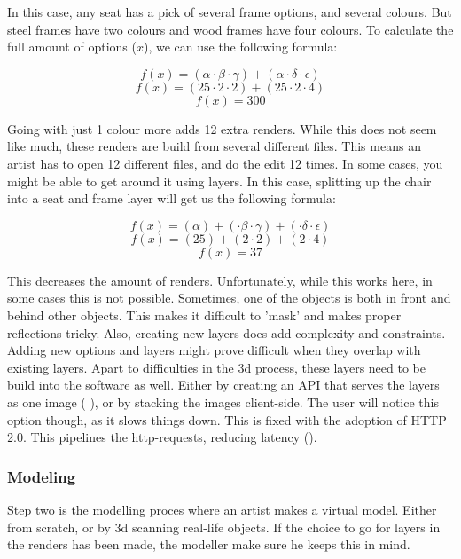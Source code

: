 In this case, any seat has a pick of several frame options, and several colours. But steel frames have two colours and wood frames have four colours. To calculate the full amount of options ($x$), we can use the following formula:
 
\[ f(x) = (\alpha \cdot \beta \cdot \gamma) + (\alpha \cdot \delta \cdot \epsilon)\]
\[ f(x) = (25 \cdot 2 \cdot 2) + (25 \cdot 2 \cdot 4)\]
\[ f(x) = 300\]

Going with just 1 colour more adds 12 extra renders. While this does not seem like much, these renders are build from several different files. This means an artist has to open 12 different files, and do the edit 12 times.
In some cases, you might be able to get around it using layers. In this case, splitting up the chair into a seat and frame layer will get us the following formula:

\[ f(x) = (\alpha) + (\cdot \beta \cdot \gamma) + (\cdot \delta \cdot \epsilon)\]
\[ f(x) = (25) + (2 \cdot 2) + (2 \cdot 4)\]
\[ f(x) = 37\]

This decreases the amount of renders. Unfortunately, while this works here, in some cases this is not possible. Sometimes, one of the objects is both in front and behind other objects. This makes it difficult to 'mask' and makes proper reflections tricky. Also, creating new layers does add complexity and constraints. Adding new options and layers might prove difficult when they overlap with existing layers.
\newline
Apart to difficulties in the 3d process, these layers need to be build into the software as well. Either by creating an API that serves the layers as one image (\cite{bugaboo} ), or by stacking the images client-side. The user will notice this option though, as it slows things down. This is fixed with the adoption of HTTP 2.0. This pipelines the http-requests, reducing latency (\cite{latency}).

\subsubsection{Modeling}
Step two is the modelling proces where an artist makes a virtual model. Either from scratch, or by 3d scanning real-life objects. If the choice to go for layers in the renders has been made, the modeller make sure he keeps this in mind.

